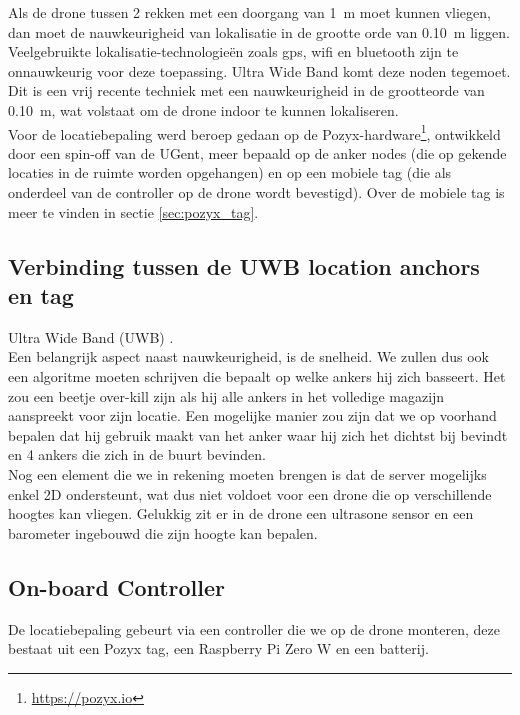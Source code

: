 Als de drone tussen 2 rekken met een doorgang van \SI{1}{\m} moet kunnen vliegen, dan moet de nauwkeurigheid van lokalisatie in de grootte orde van \SI{0.10}{\m} liggen. Veelgebruikte lokalisatie-technologie\"en zoals gps, wifi en bluetooth zijn te onnauwkeurig voor deze toepassing. Ultra Wide Band komt deze noden tegemoet. Dit is een vrij recente techniek met een nauwkeurigheid in de grootteorde van \SI{0.10}{\m}, wat volstaat om de drone indoor te kunnen lokaliseren.\\

Voor de locatiebepaling werd beroep gedaan op de Pozyx-hardware\footnote{\url{https://pozyx.io}}, ontwikkeld door een spin-off van de UGent, meer bepaald op de anker nodes (die op gekende locaties in de ruimte worden opgehangen) en op een mobiele tag (die als onderdeel van de controller op de drone wordt bevestigd).
Over de mobiele tag is meer te vinden in sectie \ref{sec:pozyx_tag}.

\subsection{Verbinding tussen de UWB location anchors en tag} \label{sec:uwb_tag}
Ultra Wide Band (UWB) \cite{uwb2016}.\\

Een belangrijk aspect naast nauwkeurigheid, is de snelheid.
We zullen dus ook een algoritme moeten schrijven die bepaalt op welke ankers hij zich basseert.
Het zou een beetje over-kill zijn als hij alle ankers in het volledige magazijn aanspreekt voor zijn locatie.
Een mogelijke manier zou zijn dat we op voorhand bepalen dat hij gebruik maakt van het anker waar hij zich het dichtst bij bevindt en 4 ankers die zich in de buurt bevinden.\\

Nog een element die we in rekening moeten brengen is dat de server mogelijks enkel 2D ondersteunt, wat dus niet voldoet voor een drone die op verschillende hoogtes kan vliegen.
Gelukkig zit er in de drone een ultrasone sensor en een barometer ingebouwd die zijn hoogte kan bepalen.

\subsection{On-board Controller} \label{sec:onboard_controller}

De locatiebepaling gebeurt via een controller die we op de drone monteren, deze bestaat uit een Pozyx tag, een Raspberry Pi Zero W en een batterij.

